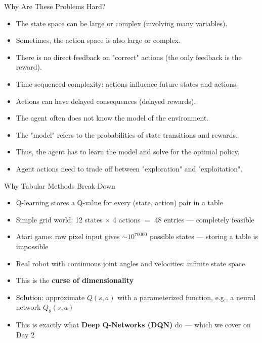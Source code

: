 \begin{frame}{Why Are These Problems Hard?}
    \begin{itemize}
        \item The state space can be large or complex (involving many variables).
        \item Sometimes, the action space is also large or complex.
        \item There is no direct feedback on "correct" actions (the only feedback is the reward).
        \item Time-sequenced complexity: actions influence future states and actions.
        \item Actions can have delayed consequences (delayed rewards).
        \item The agent often does not know the model of the environment.
        \item The "model" refers to the probabilities of state transitions and rewards.
        \item Thus, the agent has to learn the model and solve for the optimal policy.
        \item Agent actions need to trade off between "exploration" and "exploitation".
    \end{itemize}
\end{frame}

\begin{frame}{Why Tabular Methods Break Down}
\begin{itemize}
    \item Q-learning stores a Q-value for every (state, action) pair in a table
    \item Simple grid world: 12 states $\times$ 4 actions $=$ 48 entries --- completely feasible
    \item Atari game: raw pixel input gives $\sim 10^{70000}$ possible states --- storing a table is impossible
    \item Real robot with continuous joint angles and velocities: infinite state space
    \item This is the \textbf{curse of dimensionality}
    \item Solution: approximate $Q(s,a)$ with a parameterized function, e.g., a neural network $Q_\theta(s,a)$
    \item This is exactly what \textbf{Deep Q-Networks (DQN)} do --- which we cover on Day 2
\end{itemize}
\end{frame}